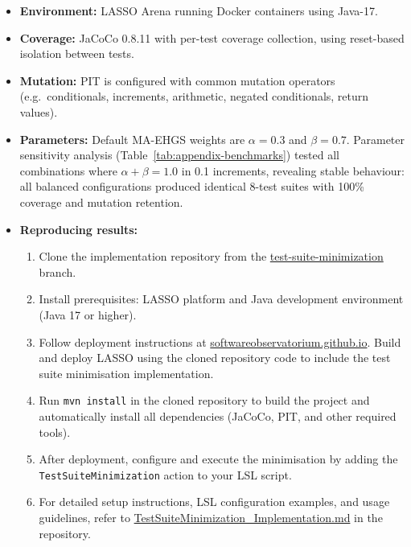\begin{appendices}
\begin{itemize}
  \item \textbf{Environment:} LASSO Arena running Docker containers using Java-17.
  \item \textbf{Coverage:} JaCoCo 0.8.11 with per-test coverage collection, using reset-based isolation between tests.
  \item \textbf{Mutation:} PIT is configured with common mutation operators (e.g.\ conditionals, increments, arithmetic, negated conditionals, return values).
  \item \textbf{Parameters:} Default MA-EHGS weights are $\alpha = 0.3$ and $\beta = 0.7$. Parameter sensitivity analysis (Table~\ref{tab:appendix-benchmarks}) tested all combinations where $\alpha + \beta = 1.0$ in 0.1 increments, revealing stable behaviour: all balanced configurations produced identical 8-test suites with 100\% coverage and mutation retention.
  \item \textbf{Reproducing results:}
  \begin{enumerate}
    \item Clone the implementation repository from the \href{https://swtrepo.informatik.uni-mannheim.de/laith.sandouk/lasso/-/tree/test-suite-minimization}{test-suite-minimization} branch.
    \item Install prerequisites: LASSO platform and Java development environment (Java 17 or higher).
    \item Follow deployment instructions at \href{https://softwareobservatorium.github.io/web/}{softwareobservatorium.github.io}. Build and deploy LASSO using the cloned repository code to include the test suite minimisation implementation.
    \item Run \texttt{mvn install} in the cloned repository to build the project and automatically install all dependencies (JaCoCo, PIT, and other required tools).
    \item After deployment, configure and execute the minimisation by adding the \texttt{TestSuiteMinimization} action to your LSL script.
    \item For detailed setup instructions, LSL configuration examples, and usage guidelines, refer to \href{https://swtrepo.informatik.uni-mannheim.de/laith.sandouk/lasso/-/blob/test-suite-minimization/TestSuiteMinimization_Implementation.md}{TestSuiteMinimization\_Implementation.md} in the repository.
  \end{enumerate}
\end{itemize}


\end{appendices}
